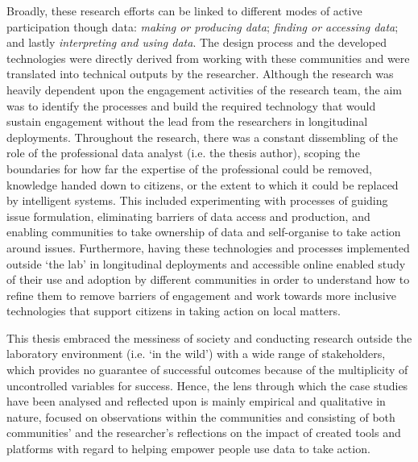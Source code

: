 \begin{introduction}
Broadly, these research efforts can be linked to different modes of active participation though data: \textit{making or producing data}; \textit{finding or accessing data}; and lastly \textit{interpreting and using data}. The design process and the developed technologies were directly derived from working with these communities and were translated into technical outputs by the researcher. Although the research was heavily dependent upon the engagement activities of the research team, the aim was to identify the processes and build the required technology that would sustain engagement without the lead from the researchers in longitudinal deployments. Throughout the research, there was a constant dissembling of the role of the professional data analyst (i.e. the thesis author), scoping the boundaries for how far the expertise of the professional could be removed, knowledge handed down to citizens, or the extent to which it could be replaced by intelligent systems. This included experimenting with processes of guiding issue formulation, eliminating barriers of data access and production, and enabling communities to take ownership of data and self-organise to take action around issues. Furthermore, having these technologies and processes implemented outside `the lab' in longitudinal deployments and accessible online enabled study of their use and adoption by different communities in order to understand how to refine them to remove barriers of engagement and work towards more inclusive technologies that support citizens in taking action on local matters.

This thesis embraced the messiness of society and conducting research outside the laboratory environment (i.e. `in the wild') with a wide range of stakeholders, which provides no guarantee of successful outcomes because of the multiplicity of uncontrolled variables for success. Hence, the lens through which the case studies have been analysed and reflected upon is mainly empirical and qualitative in nature, focused on observations within the communities and consisting of both communities' and the researcher's reflections on the impact of created tools and platforms with regard to helping empower people use data to take action.


\end{introduction}
